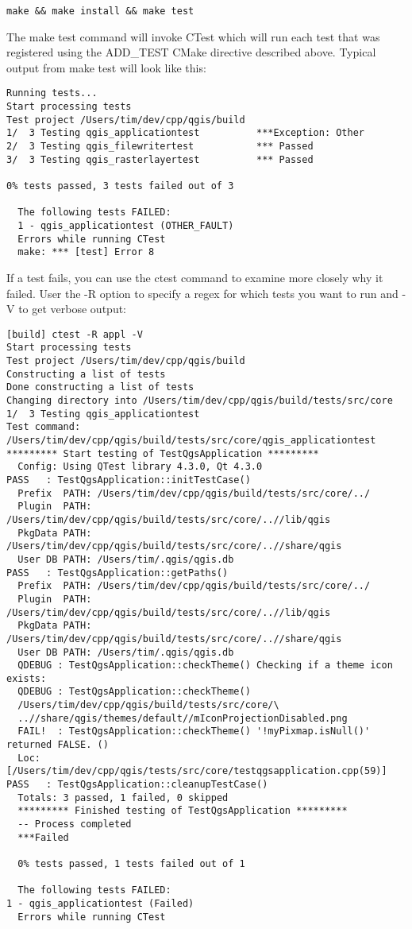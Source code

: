 \begin{verbatim}
make && make install && make test
\end{verbatim}

The make test command will invoke CTest which will run each test that was
registered using the ADD\_TEST CMake directive described above. Typical output
from make test will look like this:

\begin{verbatim}
Running tests...
Start processing tests
Test project /Users/tim/dev/cpp/qgis/build
1/  3 Testing qgis_applicationtest          ***Exception: Other
2/  3 Testing qgis_filewritertest           *** Passed
3/  3 Testing qgis_rasterlayertest          *** Passed

0% tests passed, 3 tests failed out of 3

  The following tests FAILED:
  1 - qgis_applicationtest (OTHER_FAULT)
  Errors while running CTest
  make: *** [test] Error 8
\end{verbatim}

If a test fails, you can use the ctest command to examine more closely why it
failed. User the -R option to specify a regex for which tests you want to run
and -V to get verbose output:

\begin{verbatim}
[build] ctest -R appl -V
Start processing tests
Test project /Users/tim/dev/cpp/qgis/build
Constructing a list of tests
Done constructing a list of tests
Changing directory into /Users/tim/dev/cpp/qgis/build/tests/src/core
1/  3 Testing qgis_applicationtest          
Test command: /Users/tim/dev/cpp/qgis/build/tests/src/core/qgis_applicationtest
********* Start testing of TestQgsApplication *********
  Config: Using QTest library 4.3.0, Qt 4.3.0
PASS   : TestQgsApplication::initTestCase()
  Prefix  PATH: /Users/tim/dev/cpp/qgis/build/tests/src/core/../
  Plugin  PATH: /Users/tim/dev/cpp/qgis/build/tests/src/core/..//lib/qgis
  PkgData PATH: /Users/tim/dev/cpp/qgis/build/tests/src/core/..//share/qgis
  User DB PATH: /Users/tim/.qgis/qgis.db
PASS   : TestQgsApplication::getPaths()
  Prefix  PATH: /Users/tim/dev/cpp/qgis/build/tests/src/core/../
  Plugin  PATH: /Users/tim/dev/cpp/qgis/build/tests/src/core/..//lib/qgis
  PkgData PATH: /Users/tim/dev/cpp/qgis/build/tests/src/core/..//share/qgis
  User DB PATH: /Users/tim/.qgis/qgis.db
  QDEBUG : TestQgsApplication::checkTheme() Checking if a theme icon exists:
  QDEBUG : TestQgsApplication::checkTheme() 
  /Users/tim/dev/cpp/qgis/build/tests/src/core/\
  ..//share/qgis/themes/default//mIconProjectionDisabled.png
  FAIL!  : TestQgsApplication::checkTheme() '!myPixmap.isNull()' returned FALSE. ()
  Loc: [/Users/tim/dev/cpp/qgis/tests/src/core/testqgsapplication.cpp(59)]
PASS   : TestQgsApplication::cleanupTestCase()
  Totals: 3 passed, 1 failed, 0 skipped
  ********* Finished testing of TestQgsApplication *********
  -- Process completed
  ***Failed

  0% tests passed, 1 tests failed out of 1

  The following tests FAILED:
1 - qgis_applicationtest (Failed)
  Errors while running CTest

\end{verbatim}

